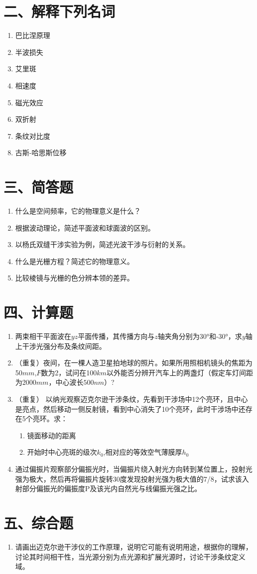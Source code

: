\documentclass[12pt, a4paper]{article}
\theoremstyle{solution}
\begin{document}
\section*{二、解释下列名词}
\begin{enumerate}
    \item 巴比涅原理
    \item 半波损失
    \item 艾里斑
    \item 相速度
    \item 磁光效应
    \item 双折射
    \item 条纹对比度
    \item 古斯-哈思斯位移
\end{enumerate}
\section*{三、简答题}
\begin{enumerate}
    \item 什么是空间频率，它的物理意义是什么？
    \item 根据波动理论，简述平面波和球面波的区别。
    \item 以杨氏双缝干涉实验为例，简述光波干涉与衍射的关系。
    \item 什么是光栅方程？简述它的物理意义。
    \item 比较棱镜与光栅的色分辨本领的差异。
\end{enumerate}
\section*{四、计算题}
\begin{enumerate}
    \item 两束相干平面波在$yz$平面传播，其传播方向与$z$轴夹角分别为30°和-30°，求$y$轴上干涉光强分布及条纹间距。
    \item （重复）夜间，在一棵人造卫星拍地球的照片。如果所用照相机镜头的焦距为50$mm$,$F$数为2，试问在100$km$以外能否分辨开汽车上的两盏灯（假定车灯间距为2000$mm$，中心波长$500nm$）?
    \item （重复） 以纳光观察迈克尔逊干涉条纹，先看到干涉场中12个亮环，且中心是亮点，然后移动一侧反射镜，看到中心消失了10个亮环，此时干涉场中还存在5个亮环。求：
    \begin{enumerate}
        \item 镜面移动的距离
        \item 开始时中心亮斑的级次$k_0$,相对应的等效空气薄膜厚$h_0$
    \end{enumerate}
    \item 通过偏振片观察部分偏振光时，当偏振片绕入射光方向转到某位置上，投射光强为极大，然后再将偏振片旋转30度发现投射光强为极大值的7/8，试求该入射部分偏振光的偏振度P及该光内自然光与线偏振光强之比。
\end{enumerate}
\section*{五、综合题}
\begin{enumerate}
    \item 请画出迈克尔逊干涉仪的工作原理，说明它可能有说明用途，根据你的理解，讨论其时间相干性，当光源分别为点光源和扩展光源时，讨论干涉条纹定义域。

\end{enumerate}
\end{document}

